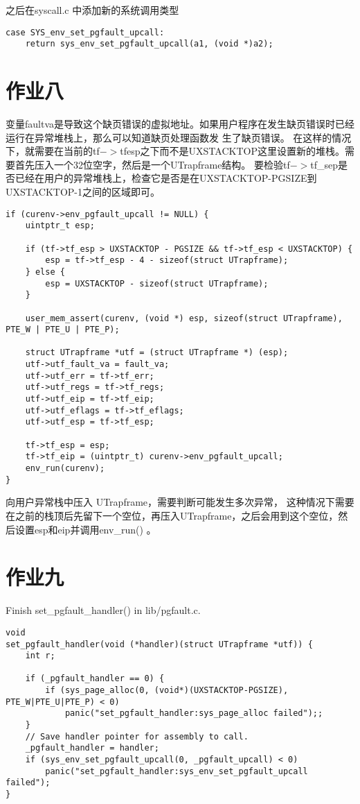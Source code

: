 \documentclass[12pt,a4paper]{article}
\begin{document}
    之后在syscall.c 中添加新的系统调用类型
    \begin{lstlisting}[style=CPP]
case SYS_env_set_pgfault_upcall:
    return sys_env_set_pgfault_upcall(a1, (void *)a2);
    \end{lstlisting}

\section{作业八}

变量faultva是导致这个缺页错误的虚拟地址。如果用户程序在发生缺页错误时已经运行在异常堆栈上，那么可以知道缺页处理函数发 生了缺页错误。
在这样的情况下，就需要在当前的tf$->$tfesp之下而不是UXSTACKTOP这里设置新的堆栈。需要首先压入一个32位空字，然后是一个UTrapframe结构。
要检验tf$->$tf\_sep是否已经在用户的异常堆栈上，检查它是否是在UXSTACKTOP-PGSIZE到UXSTACKTOP-1之间的区域即可。

\begin{lstlisting}[style=CPP]
if (curenv->env_pgfault_upcall != NULL) { 
    uintptr_t esp; 
 
    if (tf->tf_esp > UXSTACKTOP - PGSIZE && tf->tf_esp < UXSTACKTOP) { 
        esp = tf->tf_esp - 4 - sizeof(struct UTrapframe);    
    } else { 
        esp = UXSTACKTOP - sizeof(struct UTrapframe); 
    } 
 
    user_mem_assert(curenv, (void *) esp, sizeof(struct UTrapframe), PTE_W | PTE_U | PTE_P); 
 
    struct UTrapframe *utf = (struct UTrapframe *) (esp); 
    utf->utf_fault_va = fault_va; 
    utf->utf_err = tf->tf_err; 
    utf->utf_regs = tf->tf_regs; 
    utf->utf_eip = tf->tf_eip; 
    utf->utf_eflags = tf->tf_eflags; 
    utf->utf_esp = tf->tf_esp; 
 
    tf->tf_esp = esp; 
    tf->tf_eip = (uintptr_t) curenv->env_pgfault_upcall; 
    env_run(curenv); 
} 

\end{lstlisting}

向用户异常栈中压入 UTrapframe，需要判断可能发生多次异常，
这种情况下需要在之前的栈顶后先留下一个空位，再压入UTrapframe，之后会用到这个空位，然后设置esp和eip并调用env\_run() 。

\section{作业九}

Finish set\_pgfault\_handler() in lib/pgfault.c.

\begin{lstlisting}[style=CPP]
void
set_pgfault_handler(void (*handler)(struct UTrapframe *utf)) {
    int r;

    if (_pgfault_handler == 0) {
        if (sys_page_alloc(0, (void*)(UXSTACKTOP-PGSIZE), PTE_W|PTE_U|PTE_P) < 0) 
            panic("set_pgfault_handler:sys_page_alloc failed");;
    }
    // Save handler pointer for assembly to call.
    _pgfault_handler = handler;
    if (sys_env_set_pgfault_upcall(0, _pgfault_upcall) < 0)
        panic("set_pgfault_handler:sys_env_set_pgfault_upcall failed");
}

\end{lstlisting}
\end{document}
